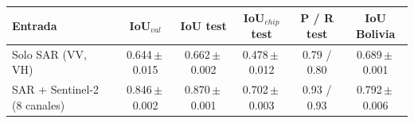 \begin{tabular}{lcccc|c}
\toprule
Entrada & IoU$_{val}$ & IoU test & IoU$_{chip}$ test & P / R test & IoU Bolivia \\
\midrule
Solo SAR (VV, VH) & 0.644\,$\pm$\,0.015 & 0.662\,$\pm$\,0.002 & 0.478\,$\pm$\,0.012 & 0.79 / 0.80 & 0.689\,$\pm$\,0.001 \\
SAR + Sentinel-2 (8 canales) & 0.846\,$\pm$\,0.002 & 0.870\,$\pm$\,0.001 & 0.702\,$\pm$\,0.003 & 0.93 / 0.93 & 0.792\,$\pm$\,0.006 \\
\bottomrule
\end{tabular}
